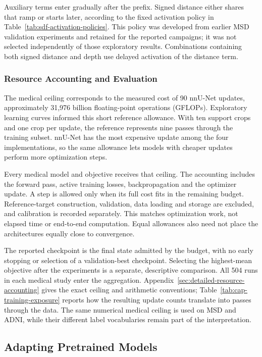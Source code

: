 \documentclass[12pt,a4paper]{article}
\begin{document}
Auxiliary terms enter gradually after the prefix. Signed distance either
shares that ramp or starts later, according to the fixed activation
policy in Table~\ref{tab:sdf-activation-policies}. This policy was developed
from earlier MSD validation experiments and retained for the reported
campaigns; it was not selected independently of those exploratory results.
Combinations containing both signed distance and depth use delayed
activation of the distance term.

\subsubsection{Resource Accounting and Evaluation}

The medical ceiling corresponds to the measured cost of 90 nnU-Net
updates, approximately 31,976 billion floating-point operations (GFLOPs).
Exploratory learning curves informed this short reference allowance.
With ten support crops and one crop per update, the reference represents
nine passes through the training subset. nnU-Net has the most expensive
update among the four implementations, so the same allowance lets models
with cheaper updates perform more optimization steps.

Every medical model and objective receives that ceiling. The accounting
includes the forward pass, active training losses, backpropagation and
the optimizer update. A step is allowed only when its full cost fits in
the remaining budget. Reference-target construction, validation, data
loading and storage are excluded, and calibration is recorded separately.
This matches optimization work, not elapsed time or end-to-end computation.
Equal allowances also need not place the architectures equally close to
convergence.

The reported checkpoint is the final state admitted by the budget, with
no early stopping or selection of a validation-best checkpoint. Selecting
the highest-mean objective after the experiments is a separate, descriptive
comparison. All 504 runs in each medical study enter the aggregation.
Appendix~\ref{sec:detailed-resource-accounting} gives the exact ceiling
and arithmetic conventions; Table~\ref{tab:cap-training-exposure} reports
how the resulting update counts translate into passes through the data.
The same numerical medical ceiling is used on MSD and ADNI, while their
different label vocabularies remain part of the interpretation.

\subsection{Adapting Pretrained Models}
\end{document}
